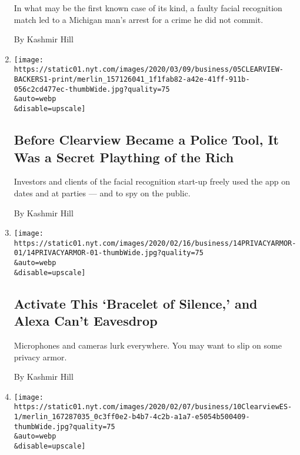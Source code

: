 \begin{enumerate}
  In what may be the first known case of its kind, a faulty facial
  recognition match led to a Michigan man's arrest for a crime he did
  not commit.

  By Kashmir Hill
\item
  \href{/2020/03/05/technology/clearview-investors.html}{}

  \texttt{[image: https://static01.nyt.com/images/2020/03/09/business/05CLEARVIEW-BACKERS1-print/merlin\_157126041\_1f1fab82-a42e-41ff-911b-056c2cd477ec-thumbWide.jpg?quality=75\\\&auto=webp\\\&disable=upscale]}

  \hypertarget{before-clearview-became-a-police-tool-it-was-a-secret-plaything-of-the-rich}{%
  \subsection{Before Clearview Became a Police Tool, It Was a Secret
  Plaything of the
  Rich}\label{before-clearview-became-a-police-tool-it-was-a-secret-plaything-of-the-rich}}

  Investors and clients of the facial recognition start-up freely used
  the app on dates and at parties --- and to spy on the public.

  By Kashmir Hill
\item
  \href{/2020/02/14/technology/alexa-jamming-bracelet-privacy-armor.html}{}

  \texttt{[image: https://static01.nyt.com/images/2020/02/16/business/14PRIVACYARMOR-01/14PRIVACYARMOR-01-thumbWide.jpg?quality=75\\\&auto=webp\\\&disable=upscale]}

  \hypertarget{activate-this-bracelet-of-silence-and-alexa-cant-eavesdrop}{%
  \subsection{Activate This `Bracelet of Silence,' and Alexa Can't
  Eavesdrop}\label{activate-this-bracelet-of-silence-and-alexa-cant-eavesdrop}}

  Microphones and cameras lurk everywhere. You may want to slip on some
  privacy armor.

  By Kashmir Hill
\item
  \href{/es/2020/02/10/espanol/negocios/clearview-reconocimiento-facial.html}{}

  \texttt{[image: https://static01.nyt.com/images/2020/02/07/business/10ClearviewES-1/merlin\_167287035\_0c3ff0e2-b4b7-4c2b-a1a7-e5054b500409-thumbWide.jpg?quality=75\\\&auto=webp\\\&disable=upscale]}


\end{enumerate}
